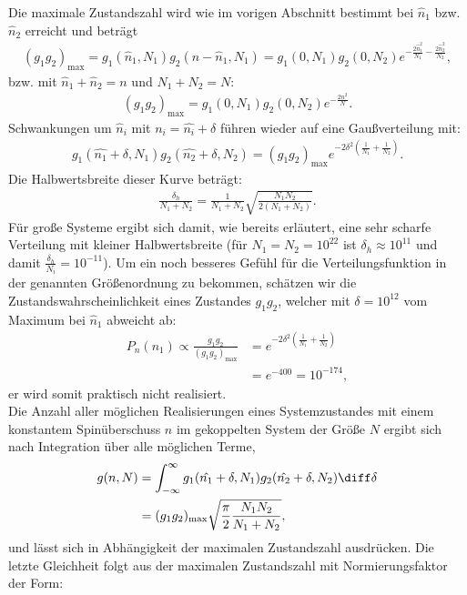 Die maximale Zustandszahl wird \textendash{} wie im vorigen Abschnitt bestimmt \textendash{} bei $\hat{n}_1$ bzw. $\hat{n}_2$ erreicht und beträgt 
\begin{align*}
    (g_1g_2)_\mathrm{max} = g_1(\hat{n}_1,N_1)g_2(n-\hat{n}_1,N_1) = g_1(0,N_1)g_2(0,N_2) e^{-\frac{2\hat{n}_1^2}{N_1}-\frac{2\hat{n}_2^2}{N_2}},
\end{align*}
bzw. mit $\hat{n}_1+\hat{n}_2=n$ und $N_1+N_2=N$:
\begin{align*}
    (g_1g_2)_\mathrm{max} = g_1(0,N_1)g_2(0,N_2) e^{-\frac{2n^2}{N}}. 
\end{align*}
Schwankungen um $\hat{n}_i$ mit $n_i=\hat{n_i}+\delta$ führen wieder auf eine Gaußverteilung mit:
\begin{align*}
    g_1(\hat{n_1}+\delta,N_1)g_2(\hat{n_2}+\delta,N_2)=(g_1g_2)_\mathrm{max}e^{-2\delta^2 (\frac{1}{N_1}+\frac{1}{N_2})}. 
\end{align*}
Die Halbwertsbreite dieser Kurve beträgt:
\begin{align*}
    \frac{\delta_h}{N_1+N_2}=\frac{1}{N_1+N_2}\sqrt{\frac{N_1N_2}{2(N_1+N_2)}}. 
\end{align*}
Für große Systeme ergibt sich damit, wie bereits erläutert, eine sehr scharfe Verteilung mit kleiner Halbwertsbreite (für $N_1=N_2=10^{22}$ ist $\delta_h\approx 10^{11}$ und damit $\frac{\delta_h}{N_i}=10^{-11}$). Um ein noch besseres Gefühl für die Verteilungsfunktion in der genannten Größenordnung zu bekommen, schätzen wir die Zustandswahrscheinlichkeit eines Zustandes $g_1g_2$, welcher mit $\delta=10^{12}$ vom Maximum bei $\hat{n}_1$ abweicht ab:
\begin{align*}
    P_n(n_1)\propto\frac{g_1g_2}{(g_1g_2)_\mathrm{max}}&=e^{-2\delta^2(\frac{1}{N_1}+\frac{1}{N_2})}\\&=e^{-400}=10^{-174},
\end{align*}
er wird somit praktisch nicht realisiert. \\
Die Anzahl aller möglichen Realisierungen eines Systemzustandes mit einem konstantem Spinüberschuss $n$ im gekoppelten System der Größe $N$ ergibt sich nach Integration über alle möglichen Terme,
\begin{align*}
    g(n,N)&=\int_{-\infty}^{\infty}g_1(\hat{n_1}+\delta,N_1)g_2(\hat{n_2}+\delta,N_2)\diff\delta\\&=
    (g_1g_2)_\mathrm{max}\sqrt{\frac{\pi}{2}\frac{N_1N_2}{N_1+N_2}},
\end{align*}
und lässt sich in Abhängigkeit der maximalen Zustandszahl ausdrücken. Die letzte Gleichheit folgt aus der maximalen Zustandszahl mit Normierungsfaktor der Form:
